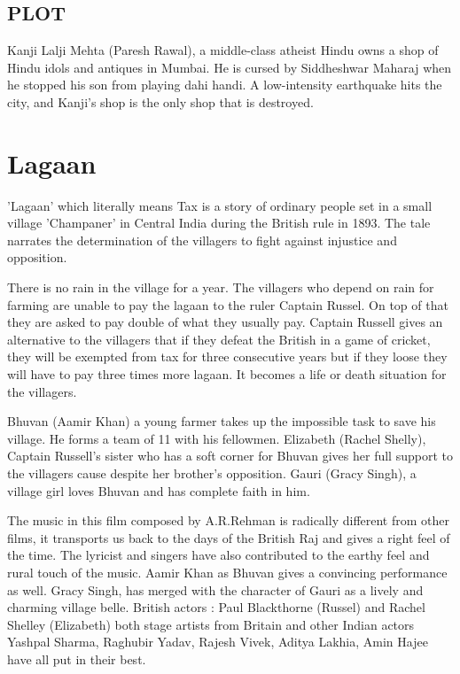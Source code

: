 \documentclass[a4paper]{article}
\begin{document}
	   
	
	   
	
	
	  
	  
	
	\subsection{PLOT}
Kanji Lalji Mehta (Paresh Rawal), a middle-class atheist Hindu owns a shop of Hindu idols and antiques in Mumbai. He is cursed by Siddheshwar Maharaj when he stopped his son from playing dahi handi. A low-intensity earthquake hits the city, and Kanji's shop is the only shop that is destroyed.	
	
	
	
	  \section{Lagaan }
	  'Lagaan' which literally means Tax is a story of ordinary people set in a small village 'Champaner' in Central India during the British rule in 1893. The tale narrates the determination of the villagers to fight against injustice and opposition.
	  
	  There is no rain in the village for a year. The villagers who depend on rain for farming are unable to pay the lagaan to the ruler Captain Russel. On top of that they are asked to pay double of what they usually pay. Captain Russell gives an alternative to the villagers that if they defeat the British in a game of cricket, they will be exempted from tax for three consecutive years but if they loose they will have to pay three times more lagaan. It becomes a life or death situation for the villagers.


	  
	  Bhuvan (Aamir Khan) a young farmer takes up the impossible task to save his village. He forms a team of 11 with his fellowmen. Elizabeth (Rachel Shelly), Captain Russell's sister who has a soft corner for Bhuvan gives her full support to the villagers cause despite her brother's opposition. Gauri (Gracy Singh), a village girl loves Bhuvan and has complete faith in him.

The music in this film composed by A.R.Rehman is radically different from other films, it transports us back to the days of the British Raj and gives a right feel of the time. The lyricist and singers have also contributed to the earthy feel and rural touch of the music. Aamir Khan as Bhuvan gives a convincing performance as well. Gracy Singh, has merged with the character of Gauri as a lively and charming village belle. British actors : Paul Blackthorne (Russel) and Rachel Shelley (Elizabeth) both stage artists from Britain and other Indian actors Yashpal Sharma, Raghubir Yadav, Rajesh Vivek, Aditya Lakhia, Amin Hajee have all put in their best.
\end{document}
